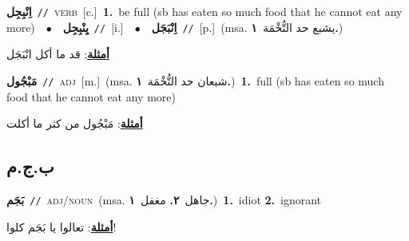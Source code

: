 \documentclass[10pt,a4paper,twoside]{article} %
\begin{document}
\begin{multicols}{2}
{{{{{\setlength\topsep{0pt}\textbf{\foreignlanguage{arabic}{اِنْبِجِل}}\ {\color{gray}\texttt{//}\color{black}}\ \textsc{verb}\ [c.]\ \textbf{1.}~be full (sb has eaten so much food that he cannot eat any more)\ \ $\bullet$\ \ \setlength\topsep{0pt}\textbf{\foreignlanguage{arabic}{يِنْبِجِل}}\ {\color{gray}\texttt{//}\color{black}}\ [i.]\ \ $\bullet$\ \ \setlength\topsep{0pt}\textbf{\foreignlanguage{arabic}{اِنْبَجَل}}\ {\color{gray}\texttt{//}\color{black}}\ [p.]\ \color{gray}(msa. \foreignlanguage{arabic}{يشبع حد التُّخْمَة}~\foreignlanguage{arabic}{\textbf{١.}})\color{black}\  \begin{flushright}\color{gray}\foreignlanguage{arabic}{\textbf{\underline{\foreignlanguage{arabic}{أمثلة}}}: قد ما أكل انْبَجَل}\end{flushright}\color{black}} \vspace{2mm}

{\setlength\topsep{0pt}\textbf{\foreignlanguage{arabic}{مَبْجُول}}\ {\color{gray}\texttt{//}\color{black}}\ \textsc{adj}\ [m.]\ \color{gray}(msa. \foreignlanguage{arabic}{شبعان حد التُّخْمَة}~\foreignlanguage{arabic}{\textbf{١.}})\color{black}\ \textbf{1.}~full (sb has eaten so much food that he cannot eat any more)\  \begin{flushright}\color{gray}\foreignlanguage{arabic}{\textbf{\underline{\foreignlanguage{arabic}{أمثلة}}}: مَبْجُول من كثر ما أكلت}\end{flushright}\color{black}} \vspace{2mm}

\vspace{-3mm}
\subsection*{\color{blue}\foreignlanguage{arabic}{ب.ج.م}\color{blue}{}} 

{\setlength\topsep{0pt}\textbf{\foreignlanguage{arabic}{بَجَم}}\ {\color{gray}\texttt{//}\color{black}}\ \textsc{adj/noun}\ \color{gray}(msa. \foreignlanguage{arabic}{جاهل}~\foreignlanguage{arabic}{\textbf{٢.}}  \foreignlanguage{arabic}{مغفل}~\foreignlanguage{arabic}{\textbf{١.}})\color{black}\ \textbf{1.}~idiot  \textbf{2.}~ignorant\  \begin{flushright}\color{gray}\foreignlanguage{arabic}{\textbf{\underline{\foreignlanguage{arabic}{أمثلة}}}: تعالوا يا بَجَم  كلوا!}\end{flushright}\color{black}} \vspace{2mm}

}}}}
\end{multicols}
\end{document}
